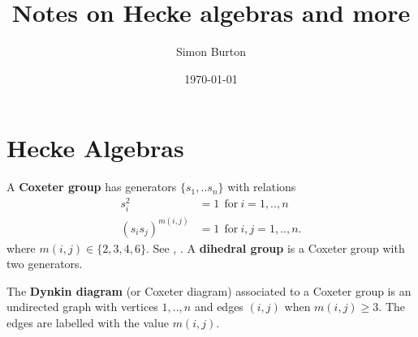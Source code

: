 \documentclass[12pt]{article}
\begin{document}
\title{Notes on Hecke algebras and more}

\author{Simon Burton}

\date{\today}


\maketitle




\def\Complex{\mathbb{C}}
\def\C{\mathbb{C}}
\def\R{\mathbb{R}}
\def\Z{\mathbb{Z}}
\def\Ham{H} 
\def\Pauli{\mathcal{P}}
\def\Spec{\mbox{Spec}}
\def\Proveit{{\it (Proof??)}}
\def\GL{\mathrm{GL}}
\def\half{\frac{1}{2}}
\def\Im{\mbox{im}}
\def\Ker{\mbox{ker}}
\def\Field{\mathcal{F}}
\def\Defn#1{{\bf #1}}

\newcommand{\ket}[1]{|{#1}\rangle}
\newcommand{\expect}[1]{\langle{#1}\rangle}
\newcommand{\bra}[1]{\langle{#1}|}
\newcommand{\ketbra}[2]{\ket{#1}\!\bra{#2}}
\newcommand{\braket}[2]{\langle{#1}|{#2}\rangle}


%
%

\section{Hecke Algebras}

A \Defn{Coxeter group}
has generators $\{s_1, .. s_n \}$
with relations
\begin{align*}
    s_i^2 &= 1 \ \ \mbox{for}\ i=1,..,n\\
    (s_i s_j)^{m(i,j)} &= 1\ \ \mbox{for}\ i,j=1,..,n.
\end{align*}
where $m(i,j)\in\{2,3,4,6\}.$
See \cite{Garrett1997}, \cite{Baez2010}.
A \Defn{dihedral group}
is a Coxeter group with two generators.

The \Defn{Dynkin diagram} (or Coxeter diagram)
associated to a Coxeter group is an undirected graph
with vertices $1,..,n$ and edges $(i,j)$ when $m(i,j)\ge 3.$
The edges are labelled with the value $m(i,j)$.
\end{document}
